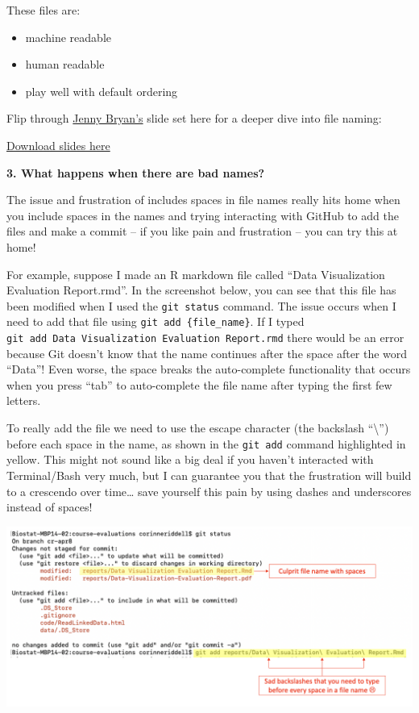 \documentclass[
]{book}
\providecommand{\tightlist}{%
  \setlength{\itemsep}{0pt}\setlength{\parskip}{0pt}}
\begin{document}
These files are:

\begin{itemize}
\tightlist
\item
  machine readable\\
\item
  human readable\\
\item
  play well with default ordering
\end{itemize}

Flip through \href{https://jennybryan.org/about/}{Jenny Bryan's} slide set here for a deeper dive into file naming:

\href{https://bph-storage.s3.us-west-1.amazonaws.com/git-for-humans/how-to-name-files.pdf}{Download slides here}

\textbf{3. What happens when there are bad names?}

The issue and frustration of includes spaces in file names really hits home when
you include spaces in the names and trying interacting with GitHub to add the files
and make a commit -- if you like pain and frustration -- you can try this at home!

For example, suppose I made an R markdown file called ``Data Visualization
Evaluation Report.rmd''. In the screenshot below, you can see that this file has
been modified when I used the \texttt{git\ status} command. The issue occurs when I need
to add that file using \texttt{git\ add\ \{file\_name\}}. If I typed \texttt{git\ add\ Data\ Visualization\ Evaluation\ Report.rmd}
there would be an error because Git doesn't know that the name continues after
the space after the word ``Data''! Even worse, the space breaks the auto-complete
functionality that occurs when you press ``tab'' to auto-complete the file name
after typing the first few letters.

To really add the file we need to use the escape character (the backslash ``\textbackslash{}'')
before each space in the name, as shown in the \texttt{git\ add} command highlighted in
yellow. This might not sound like a big deal
if you haven't interacted with Terminal/Bash very much, but I can guarantee you
that the frustration will build to a crescendo over time\ldots{} save yourself this
pain by using dashes and underscores instead of spaces!

\includegraphics[width=1\linewidth]{./figures/space-in-filename-pain}
\end{document}

